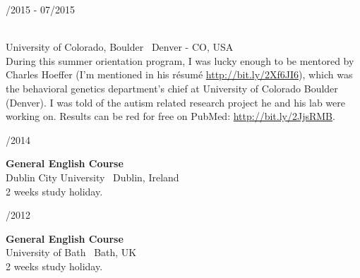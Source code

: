 \begin{minipage}{.3\textwidth}
	/2015 - 07/2015 \faCalendar
\end{minipage}
\hfill
\begin{minipage}{.65\textwidth}
	\vfill
	 \\
	\color{Maroon} University of Colorado, Boulder \color{Sepia} \hfill \faMapMarker \ Denver - CO, USA
	\smallskip
	\\
	\color{gray} During this summer orientation program, I was lucky enough to be mentored by Charles Hoeffer (I'm mentioned in his résumé \url{http://bit.ly/2Xf6JI6}), which was the behavioral genetics department's chief at University of Colorado Boulder (Denver). I was told of the autism related research project he and his lab were working on. Results can be red for free on PubMed: \url{http://bit.ly/2JjsRMB}.
	\vfill
\end{minipage}

\bigskip

\begin{minipage}{.3\textwidth}
	/2014 \faCalendar
\end{minipage}
\hfill
\begin{minipage}{.65\textwidth}
	\vfill
	{\large \textbf{General English Course}} \\
	\color{Maroon} Dublin City University \color{Sepia} \hfill \faMapMarker \ Dublin, Ireland
	\smallskip \\
	\color{gray} 2 weeks study holiday.
	\vfill
\end{minipage}

\bigskip

\begin{minipage}{.3\textwidth}
	/2012 \faCalendar
\end{minipage}
\hfill
\begin{minipage}{.64\textwidth}
	\vfill
	{\large \textbf{General English Course}} \\
	\color{Maroon} University of Bath \color{Sepia} \hfill \faMapMarker \ Bath, UK 
	\smallskip \\
	\color{gray} 2 weeks study holiday.
	\vfill
\end{minipage}